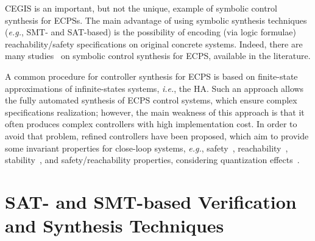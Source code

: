 \documentclass{cta-author}
\begin{document}
CEGIS is an important, but not the unique, example of symbolic control synthesis for ECPSs. The main advantage of using symbolic synthesis techniques ({\it e.g.}, SMT- and SAT-based) is the possibility of encoding (via logic formulae) reachability/safety specifications on original concrete systems. Indeed, there are many studies~\cite{Rungger13,AydinGol14,Holub16,Tabuada08,Zamani17,Zamani14,Zamani13,Zamani12,Alkhatib17,Lesser15,Girard13} on symbolic control synthesis for ECPS, available in the literature.

A common procedure for controller synthesis for ECPS is based on finite-state approximations of infinite-states systems, {\it i.e.}, the HA. Such an approach allows the fully automated synthesis of ECPS control systems, which ensure complex specifications realization; however, the main weakness of this approach is that it often produces complex controllers with high implementation cost. In order to avoid that problem, refined controllers have been proposed, which aim to provide some invariant properties for close-loop systems, {\it e.g.}, safety~\cite{Dallal17,Dallal13,Girard13}, reachability~\cite{Alkhatib17,Habets06}, stability~\cite{Zamani12,Tabuada08}, and safety/reachability properties, considering quantization effects~\cite{Reissig17}.



\section{SAT- and SMT-based Verification and Synthesis Techniques}
\label{Preliminaries}

\end{document}
